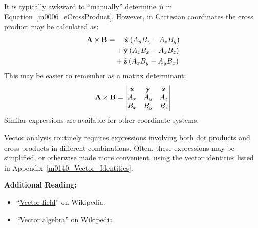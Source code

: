 It is typically awkward to ``manually'' determine $\hat{\bf n}$ in Equation~\ref{m0006_eCrossProduct}.  
However, in Cartesian coordinates the cross product may be calculated as:
%
\begin{equation}
\begin{split}
{\bf A}\times{\bf B} =& ~~~~\hat{\bf x}\left(A_y B_z - A_z B_y \right) \\
                      & +\hat{\bf y}\left(A_z B_x - A_x B_z \right) \\
                      & +\hat{\bf z}\left(A_x B_y - A_y B_x \right) 
\end{split}
\end{equation}
%
This may be easier to remember as a matrix determinant:
%
\begin{equation}
{\bf A}\times{\bf B} =
\begin{vmatrix}
\hat{\bf x} & \hat{\bf y} & \hat{\bf z} \\
A_x & A_y & A_z \\
B_x & B_y & B_z 
\end{vmatrix}
\end{equation}
%
Similar expressions are available for other coordinate systems.


Vector analysis routinely requires expressions involving both dot products and cross products in different combinations.  Often, these expressions may be simplified, or otherwise made more convenient, using the vector identities listed in Appendix~\ref{m0140_Vector_Identities}.


{\bf Additional Reading:}
\begin{itemize}
\item ``\href{https://en.wikipedia.org/wiki/Vector_field}{Vector field}'' on Wikipedia.
\item ``\href{https://en.wikipedia.org/wiki/Vector_algebra}{Vector algebra}'' on Wikipedia.
\end{itemize}

